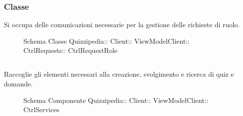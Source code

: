 \subsubsection{Classe }
Si occupa delle comunicazioni necessarie per la gestione delle richieste di ruolo.
\begin{figure}[H]
\centering
\noindent{}
\caption[Schema Classe CtrlRequestRole]{Schema Classe Quizzipedia:: Client:: ViewModelClient:: CtrlRequests:: CtrlRequestRole}
\end{figure}
\subsection{}
Raccoglie gli elementi necessari alla creazione, svolgimento e ricerca di quiz e domande.
\begin{figure}[H]
\centering
\noindent{}
\caption[Schema Componente Quizzipedia::Client::ViewModelClient::CtrlServices]{Schema Componente Quizzipedia:: Client:: ViewModelClient:: CtrlServices}
\end{figure}
